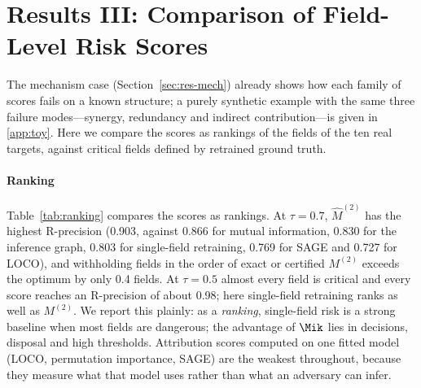 \section{Results III: Comparison of Field-Level Risk Scores}\label{sec:res-def}

The mechanism case (Section~\ref{sec:res-mech}) already shows how each family of scores fails on a
known structure; a purely synthetic example with the same three failure modes---synergy, redundancy
and indirect contribution---is given in \ref{app:toy}. Here we compare the scores as rankings of the
fields of the ten real targets, against critical fields defined by retrained ground truth.

\paragraph{Ranking}
Table~\ref{tab:ranking} compares the scores as rankings. At $\tau=0.7$, $\hat M^{(2)}$ has the
highest R-precision (0.903, against 0.866 for mutual information, 0.830 for the inference graph,
0.803 for single-field retraining, 0.769 for SAGE and 0.727 for LOCO), and withholding fields in
the order of exact or certified $M^{(2)}$ exceeds the optimum by only 0.4 fields. At $\tau=0.5$
almost every field is critical and every score reaches an R-precision of about 0.98; here
single-field retraining ranks as well as $M^{(2)}$. We report this plainly: as a \emph{ranking},
single-field risk is a strong baseline when most fields are dangerous; the advantage of $\Mik$
lies in decisions, disposal and high thresholds. Attribution scores computed on one fitted
model (LOCO, permutation importance, SAGE) are the weakest throughout, because they measure what
that model uses rather than what an adversary can infer.




